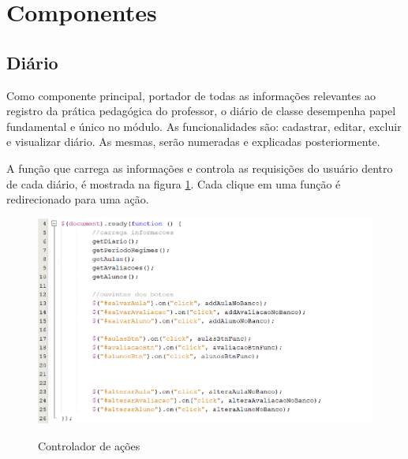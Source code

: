 \section{Componentes}

\subsection{Diário}

Como componente principal, portador de todas as informações relevantes ao registro da prática pedagógica do professor, o diário de classe desempenha papel fundamental e único no módulo. As funcionalidades são: cadastrar, editar, excluir e visualizar diário. As mesmas, serão numeradas e explicadas posteriormente.

A função que carrega as informações e controla as requisições do usuário dentro de cada diário, é mostrada na figura \ref{fig:efetuaAcoes}. Cada clique em uma função é redirecionado para uma ação.


\begin{figure}[!htb]
	\centering
	\caption{ Controlador de ações } %
	\includegraphics[scale=0.4]{efetuaAcoes}\\  %
	{\small } %
	\label{fig:efetuaAcoes} %
\end{figure}


